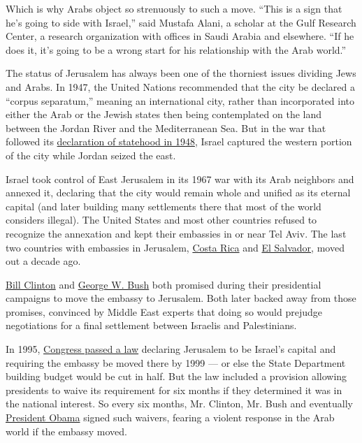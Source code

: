 Which is why Arabs object so strenuously to such a move. ``This is a
sign that he's going to side with Israel,'' said Mustafa Alani, a
scholar at the Gulf Research Center, a research organization with
offices in Saudi Arabia and elsewhere. ``If he does it, it's going to be
a wrong start for his relationship with the Arab world.''

The status of Jerusalem has always been one of the thorniest issues
dividing Jews and Arabs. In 1947, the United Nations recommended that
the city be declared a ``corpus separatum,'' meaning an international
city, rather than incorporated into either the Arab or the Jewish states
then being contemplated on the land between the Jordan River and the
Mediterranean Sea. But in the war that followed its
\href{http://learning.blogs.nytimes.com/2012/05/14/may-14-1948-israel-declares-independence/}{declaration
of statehood in 1948}, Israel captured the western portion of the city
while Jordan seized the east.

Israel took control of East Jerusalem in its 1967 war with its Arab
neighbors and annexed it, declaring that the city would remain whole and
unified as its eternal capital (and later building many settlements
there that most of the world considers illegal). The United States and
most other countries refused to recognize the annexation and kept their
embassies in or near Tel Aviv. The last two countries with embassies in
Jerusalem,
\href{http://www.nytimes.com/topic/destination/costa-rica}{Costa Rica}
and \href{http://www.nytimes.com/topic/destination/el-salvador}{El
Salvador}, moved out a decade ago.

\href{http://www.nytimes.com/topic/person/bill-clinton}{Bill Clinton}
and \href{http://www.nytimes.com/topic/person/george-w-bush}{George W.
Bush} both promised during their presidential campaigns to move the
embassy to Jerusalem. Both later backed away from those promises,
convinced by Middle East experts that doing so would prejudge
negotiations for a final settlement between Israelis and Palestinians.

In 1995,
\href{http://www.nytimes.com/1995/10/25/world/congress-backs-israel-embassy-switch-but-gives-clinton-an-out.html}{Congress
passed a law} declaring Jerusalem to be Israel's capital and requiring
the embassy be moved there by 1999 --- or else the State Department
building budget would be cut in half. But the law included a provision
allowing presidents to waive its requirement for six months if they
determined it was in the national interest. So every six months, Mr.
Clinton, Mr. Bush and eventually
\href{http://www.nytimes.com/topic/person/barack-obama?inline=nyt-per}{President
Obama} signed such waivers, fearing a violent response in the Arab world
if the embassy moved.


